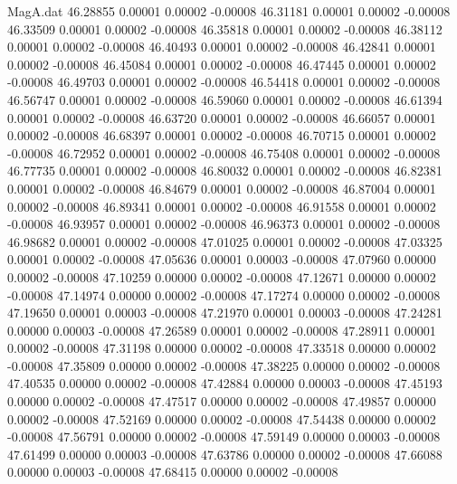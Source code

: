 \begin{filecontents}{MagA.dat}
  46.28855    0.00001    0.00002   -0.00008
  46.31181    0.00001    0.00002   -0.00008
  46.33509    0.00001    0.00002   -0.00008
  46.35818    0.00001    0.00002   -0.00008
  46.38112    0.00001    0.00002   -0.00008
  46.40493    0.00001    0.00002   -0.00008
  46.42841    0.00001    0.00002   -0.00008
  46.45084    0.00001    0.00002   -0.00008
  46.47445    0.00001    0.00002   -0.00008
  46.49703    0.00001    0.00002   -0.00008
  46.54418    0.00001    0.00002   -0.00008
  46.56747    0.00001    0.00002   -0.00008
  46.59060    0.00001    0.00002   -0.00008
  46.61394    0.00001    0.00002   -0.00008
  46.63720    0.00001    0.00002   -0.00008
  46.66057    0.00001    0.00002   -0.00008
  46.68397    0.00001    0.00002   -0.00008
  46.70715    0.00001    0.00002   -0.00008
  46.72952    0.00001    0.00002   -0.00008
  46.75408    0.00001    0.00002   -0.00008
  46.77735    0.00001    0.00002   -0.00008
  46.80032    0.00001    0.00002   -0.00008
  46.82381    0.00001    0.00002   -0.00008
  46.84679    0.00001    0.00002   -0.00008
  46.87004    0.00001    0.00002   -0.00008
  46.89341    0.00001    0.00002   -0.00008
  46.91558    0.00001    0.00002   -0.00008
  46.93957    0.00001    0.00002   -0.00008
  46.96373    0.00001    0.00002   -0.00008
  46.98682    0.00001    0.00002   -0.00008
  47.01025    0.00001    0.00002   -0.00008
  47.03325    0.00001    0.00002   -0.00008
  47.05636    0.00001    0.00003   -0.00008
  47.07960    0.00000    0.00002   -0.00008
  47.10259    0.00000    0.00002   -0.00008
  47.12671    0.00000    0.00002   -0.00008
  47.14974    0.00000    0.00002   -0.00008
  47.17274    0.00000    0.00002   -0.00008
  47.19650    0.00001    0.00003   -0.00008
  47.21970    0.00001    0.00003   -0.00008
  47.24281    0.00000    0.00003   -0.00008
  47.26589    0.00001    0.00002   -0.00008
  47.28911    0.00001    0.00002   -0.00008
  47.31198    0.00000    0.00002   -0.00008
  47.33518    0.00000    0.00002   -0.00008
  47.35809    0.00000    0.00002   -0.00008
  47.38225    0.00000    0.00002   -0.00008
  47.40535    0.00000    0.00002   -0.00008
  47.42884    0.00000    0.00003   -0.00008
  47.45193    0.00000    0.00002   -0.00008
  47.47517    0.00000    0.00002   -0.00008
  47.49857    0.00000    0.00002   -0.00008
  47.52169    0.00000    0.00002   -0.00008
  47.54438    0.00000    0.00002   -0.00008
  47.56791    0.00000    0.00002   -0.00008
  47.59149    0.00000    0.00003   -0.00008
  47.61499    0.00000    0.00003   -0.00008
  47.63786    0.00000    0.00002   -0.00008
  47.66088    0.00000    0.00003   -0.00008
  47.68415    0.00000    0.00002   -0.00008

\end{filecontents}
